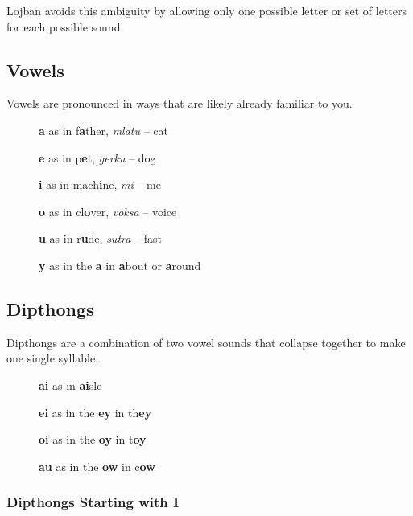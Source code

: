 \documentclass[12pt]{book}
\begin{document}
Lojban avoids this ambiguity by allowing only one possible letter or set of letters for each possible sound. 




\subsection{Vowels}

Vowels are pronounced in ways that are likely already familiar to you.

\begin{description}
\item[ ] \textbf{a} as in f\textbf{a}ther, \emph{mlatu} -- cat
\item[ ] \textbf{e} as in p\textbf{e}t, \emph{gerku} -- dog
\item[ ] \textbf{i} as in mach\textbf{i}ne, \emph{mi} -- me
\item[ ] \textbf{o} as in cl\textbf{o}ver, \emph{voksa} -- voice
\item[ ] \textbf{u} as in r\textbf{u}de, \emph{sutra} -- fast
\item[ ] \textbf{y} as in the \textbf{a} in \textbf{a}bout or \textbf{a}round 
\end{description}


\subsection{Dipthongs}

Dipthongs are a combination of two vowel sounds that collapse together to make one single syllable. 

\begin{description}
\item[ ] \textbf{ai} as in \textbf{ai}sle
\item[ ] \textbf{ei} as in the \textbf{ey} in th\textbf{ey}
\item[ ] \textbf{oi} as in the \textbf{oy} in t\textbf{oy}
\item[ ] \textbf{au} as in the \textbf{ow} in c\textbf{ow}
\end{description}


\subsubsection{Dipthongs Starting with I}
\end{document}
